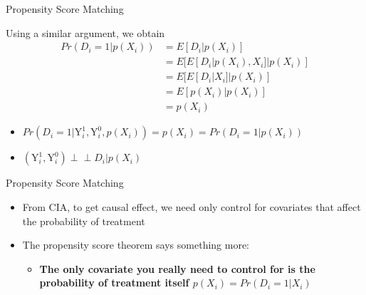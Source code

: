 \documentclass[hyperref={pdfpagelabels=false}]{beamer}
\newcommand{\indep}{\perp\!\!\!\perp}
\begin{document}
\begin{frame}{Propensity Score Matching}
	
    Using a similar argument, we obtain
	\begin{equation*}
		\begin{aligned}
			Pr(D_{i}=1|p(X_{i}))
			&= E[D_{i}|p(X_{i})] \\
			&= E[E[D_{i}|p(X_{i}),X_{i}]|p(X_{i})]\\
			&= E[E[D_{i}|X_{i}]|p(X_{i})]\\
			&= E[p(X_{i})|p(X_{i})] \\
			&= p(X_{i})
		\end{aligned}
	\end{equation*}
	\begin{itemize}
		\item[$\Rightarrow$] $Pr(D_{i}=1|\mathrm{Y}^{1}_{i},\mathrm{Y}^{0}_{i},p(X_{i}))=p(X_{i})=Pr(D_{i}=1|p(X_{i}))$
		\item[$\Rightarrow$] $(\mathrm{Y}^{1}_{i},\mathrm{Y}^{0}_{i})\indep D_{i}|p(X_{i})$
	\end{itemize}
\end{frame}







\begin{frame}{Propensity Score Matching}
	\begin{itemize}
		\item From CIA, to get causal effect, we need only control for covariates that affect the probability of treatment
		\vspace{0.2cm}
		\item The propensity score theorem says something more: 
				\vspace{0.2cm}
			\begin{itemize}
		\item \textbf{The only covariate you really need to control for is the probability of treatment itself $p(X_{i}) = Pr(D_{i}=1|X_{i}) $}
			\end{itemize}
	\end{itemize}
\end{frame}
\end{document}
